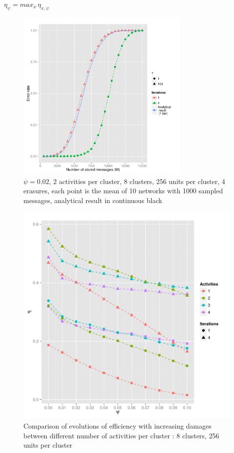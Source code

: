 \documentclass[english,10pt,twocolumn]{IEEEtran}
\theoremstyle{definition}
\begin{document}
	$\eta_\psi = max_x \, \eta_{x, \psi}$
	\begin{figure}[!htb]
		\includegraphics[width=8.5cm]{Courbes/fig2psic8l256e4psi2percent}%
		\caption{$\psi = 0.02$, 2 activities per cluster, 8 clusters, 256 units per cluster, 4 erasures, each point is the mean of 10 networks with 1000 sampled messages, analytical result in continuous black}
		\label{psith}
	\end{figure}
	
	\begin{figure}[!htb]
		
		\includegraphics[scale=0.50]{Courbes/5portant_psi_c8l256e4}
		\caption{Comparison of evolutions of efficiency with increasing damages between different number of activities per cluster :  8 clusters, 256 units per cluster%
		\label{comppsi}}
	\end{figure}
\end{document}
